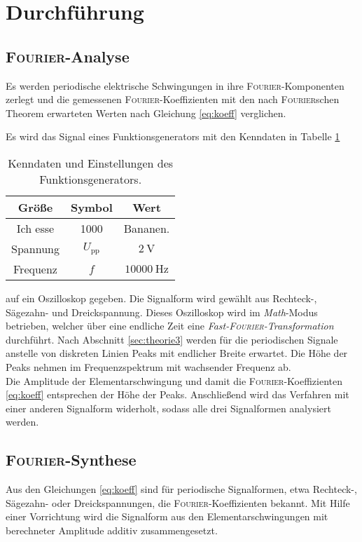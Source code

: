 \section{Durchführung}
\label{sec:Durchfuehrung}
\subsection{\textsc{Fourier}-Analyse}
Es werden periodische elektrische Schwingungen in ihre \textsc{Fourier}-Komponenten zerlegt und die gemessenen \textsc{Fourier}-Koeffizienten mit den nach \textsc{Fourier}schen Theorem erwarteten Werten nach Gleichung \ref{eq:koeff} verglichen.

Es wird das Signal eines Funktionsgenerators mit den Kenndaten in Tabelle \ref{tab:kenndaten}
\begin{table}
	\centering
	\begin{tabular}{ccc}
		\toprule
		{Größe}&{Symbol}&{Wert}\\
		\midrule
		{Ich esse}&{1000}&{Bananen.}\\
		{Spannung}&$U_\text{pp}$& $\SI{2}{\volt}$\\
		{Frequenz}&$f$& $\SI{10000}{\hertz}$\\
		\bottomrule
	\end{tabular}
	\caption{Kenndaten und Einstellungen des Funktionsgenerators.}
	\label{tab:kenndaten}
\end{table}
auf ein Oszilloskop gegeben.
Die Signalform wird gewählt aus Rechteck-, Sägezahn- und Dreickspannung.
Dieses Oszilloskop wird im \textit{Math}-Modus betrieben, welcher über eine endliche Zeit eine \textit{Fast-\textsc{Fourier}-Transformation} \cite{FFT} durchführt. 
Nach Abschnitt \ref{sec:theorie3} werden für die periodischen Signale anstelle von diskreten Linien Peaks mit endlicher Breite erwartet. 
Die Höhe der Peaks nehmen im Frequenzspektrum mit wachsender Frequenz ab.\\
Die Amplitude der Elementarschwingung und damit die \textsc{Fourier}-Koeffizienten \ref{eq:koeff} entsprechen der Höhe der Peaks. 
Anschließend wird das Verfahren mit einer anderen Signalform widerholt, sodass alle drei Signalformen analysiert werden.
%

\subsection{\textsc{Fourier}-Synthese}
Aus den Gleichungen \ref{eq:koeff} sind für periodische Signalformen, etwa Rechteck-, Sägezahn- oder Dreickspannungen, die \textsc{Fourier}-Koeffizienten bekannt. 
Mit Hilfe einer Vorrichtung wird die Signalform aus den Elementarschwingungen mit berechneter Amplitude additiv zusammengesetzt.

